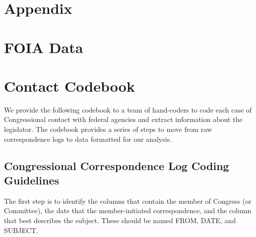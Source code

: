 \documentclass[12pt]{article}
\begin{document}

\singlespacing




\clearpage
\appendix
\setcounter{table}{0}
\renewcommand{\thetable}{A\arabic{table}}

\section*{Appendix}

%

\section{FOIA Data}
%





\section{Contact Codebook} \label{a:codebook}
\singlespacing

We provide the following codebook to a team of hand-coders to code each case of Congressional contact with federal agencies and extract information about the legislator. The codebook provides a series of steps to move from raw correspondence logs to data formatted for our analysis.  

\subsection{Congressional Correspondence Log Coding Guidelines}

The first step is to identify the columns that contain the member of Congress (or Committee), the date that the member-initiated correspondence, and the column that best describes the subject. These should be named FROM, DATE, and SUBJECT. 
\end{document}
